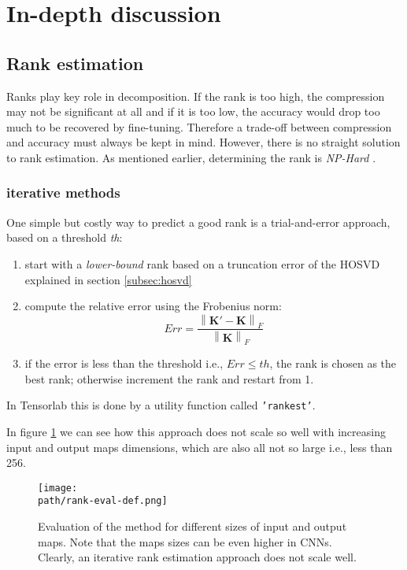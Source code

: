 \pagebreak
\section{In-depth discussion}

\subsection{Rank estimation}
Ranks play key role in decomposition. If the rank is too high, the compression may not be significant at all and if it is too low, the accuracy would drop too much to be recovered by fine-tuning. Therefore a trade-off between compression and accuracy must always be kept in mind. 
\newline 
However, there is no straight solution to rank estimation. As mentioned earlier, determining the rank is \emph{NP-Hard} \parencite{rank-hard1}\parencite{rank-hard2}\parencite{rank-hard3}. \\
 
\subsubsection{iterative methods}
One simple but costly way to predict a good rank is a trial-and-error approach, based on a threshold \emph{th}:
	\begin{enumerate}
		\item start with a \emph{lower-bound} rank based on a truncation error of the HOSVD explained in section \ref{subsec:hosvd}
		\item compute the relative error using the Frobenius norm: $$ Err = \frac{\left \| \mathbf{K'} - \mathbf{K}  \right \|_{F}}{\left \| \mathbf{K} \right \|_{F}}$$
		\item if the error is less than the threshold i.e., $Err \leq th$, the rank is chosen as the best rank; otherwise increment the rank and restart from 1. 
	\end{enumerate}

In Tensorlab this is done by a utility function called \texttt{'rankest'}.

In figure \ref{fig:rankest} we can see how this approach does not scale so well with increasing input and output maps dimensions, which are also all not so large i.e., less than 256.


\begin{figure}[h!]
 \centering
 \texttt{[image: \\path/rank-eval-def.png]} 
 \caption{Evaluation of the  method for different sizes of input and output maps. Note that the maps sizes can be even higher in CNNs. Clearly, an iterative rank estimation approach does not scale well.}
 \label{fig:rankest}
\end{figure}


